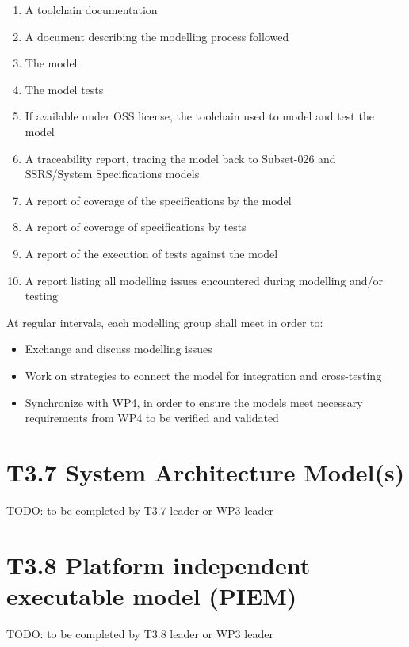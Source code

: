 \documentclass{template/openetcs_article}
\begin{document}
\begin{enumerate}
	\item A toolchain documentation
	\item A document describing the modelling process followed
	\item The model
	\item The model tests
	\item If available under OSS license, the toolchain used to model and test the model
	\item A traceability report, tracing the model back to Subset-026 and SSRS/System Specifications models
	\item A report of coverage of the specifications by the model	
	\item A report of coverage of specifications by tests	
	\item A report of the execution of tests against the model
	\item A report listing all modelling issues encountered during modelling and/or testing
\end{enumerate}

At regular intervals, each modelling group shall meet in order to:

\begin{itemize}
	\item Exchange and discuss modelling issues
	\item Work on strategies to connect the model for integration and cross-testing
	\item Synchronize with WP4, in order to ensure the models meet necessary requirements from WP4 to be verified and validated
\end{itemize}


\section{T3.7 System Architecture Model(s)}


TODO: to be completed by T3.7 leader or WP3 leader

\section{T3.8 Platform independent executable model (PIEM)}


TODO: to be completed by T3.8 leader or WP3 leader
\end{document}
